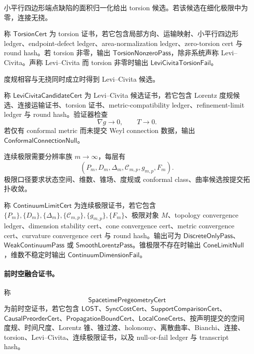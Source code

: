 小平行四边形端点缺陷的面积归一化给出 torsion 候选。若该候选在细化极限中为零，连接无挠。

\begin{definition}[torsion 证书]\label{def:typed-address-biaxial-completion-torsion-cert}
称 \(\mathsf{TorsionCert}\) 为 torsion 证书，若它包含局部方向、运输映射、小平行四边形 ledger、endpoint-defect ledger、area-normalization ledger、zero-torsion cert 与 round hash。若 torsion 非零，输出 \(\mathsf{TorsionNonzeroPass}\)，除非系统声称 Levi--Civita。声称 Levi--Civita 而 torsion 非零时输出 \(\mathsf{LeviCivitaTorsionFail}\)。
\end{definition}

度规相容与无挠同时成立时得到 Levi--Civita 候选。

\begin{definition}\label{def:typed-address-biaxial-completion-levi-civita-candidate-cert}
称 \(\mathsf{LeviCivitaCandidateCert}\) 为 Levi--Civita 候选证书，若它包含 Lorentz 度规候选、连接运输证书、torsion 证书、metric-compatibility ledger、refinement-limit ledger 与 round hash。验证器检查
\[
\nabla g\to0,
\qquad
T\to0.
\]
若仅有 conformal metric 而未提交 Weyl connection 数据，输出 \(\mathsf{ConformalConnectionNull}\)。
\end{definition}

连续极限需要分辨率族 \(m\to\infty\)，每层有
\[
(P_m,D_m,\Delta_m,\mathcal C_{m,p},g_{m,p},F_m).
\]
极限口径要求状态空间、维数、锥场、度规或 conformal class、曲率候选按提交拓扑收敛。

\begin{definition}[连续极限证书]\label{def:typed-address-biaxial-completion-continuum-limit-cert}
称 \(\mathsf{ContinuumLimitCert}\) 为连续极限证书，若它包含 \(\{P_m\},\{D_m\},\{\Delta_m\},\{\mathcal C_{m,p}\},\{g_{m,p}\},\{F_m\}\)、极限对象 \(M\)、topology convergence ledger、dimension stability cert、cone convergence cert、metric convergence cert、curvature convergence cert 与 round hash。输出可为 \(\mathsf{DiscreteOnlyPass}\)、\(\mathsf{WeakContinuumPass}\) 或 \(\mathsf{SmoothLorentzPass}\)。锥极限不存在时输出 \(\mathsf{ConeLimitNull}\)，维数不稳定时输出 \(\mathsf{ContinuumDimensionFail}\)。
\end{definition}

\paragraph{前时空融合证书。}
\begin{definition}[前时空证书]\label{def:typed-address-biaxial-completion-spacetime-pregeometry-cert}
称
\[
\mathsf{SpacetimePregeometryCert}
\]
为前时空证书，若它包含 \(\mathsf{LOST}\)、\(\mathsf{SyncCostCert}\)、\(\mathsf{SupportComparisonCert}\)、\(\mathsf{CausalPreorderCert}\)、\(\mathsf{PropagationBoundCert}\)、\(\mathsf{LocalConeCerts}\)、按声明提交的空间度规、时间尺度、Lorentz 锥、锥过渡、holonomy、离散曲率、Bianchi、连接、torsion、Levi--Civita、连续极限证书，以及 null-or-fail ledger 与 transcript hash。
\end{definition}

